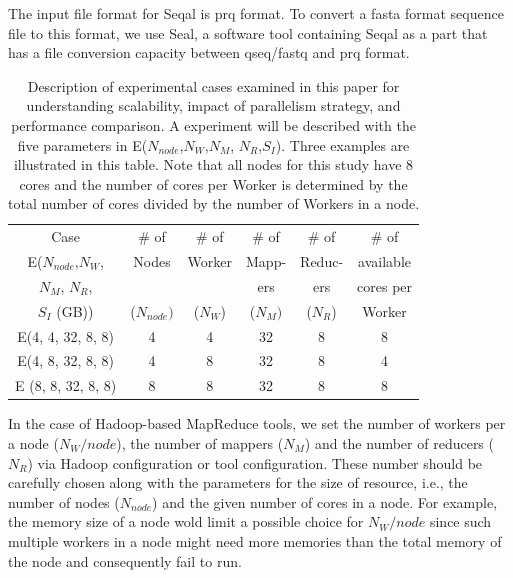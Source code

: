 \documentclass{acm_proc_article-sp}
\begin{document}
The input file format for Seqal is prq format.  To convert a fasta
format sequence file to this format, we use Seal, a software tool
containing Seqal as a part that has a file conversion capacity between
qseq/fastq and prq format.

\begin{table}
\small
 \begin{tabular}{|c|c|c|c|c|c|} 
 \hline 

Case & \# of  & \# of &  \# of & \# of & \# of  \\
E($N_{node}$,$N_W$,  & Nodes & Worker   & Mapp- & Reduc- & available  \\
$N_M$, $N_R$,  & &  & ers & ers & cores per\\
$S_I$ (GB)) & ($N_{node})$& ($N_W$) & ($N_M) $ & ($N_R$) & Worker \\
 \hline
E(4, 4, 32, 8, 8) &4 &  4 & 32  & 8 & 8 \\
E(4, 8, 32, 8, 8) & 4 & 8 & 32 & 8 & 4 \\
E (8, 8, 32, 8, 8) & 8 & 8 & 32 & 8 & 8 \\ 
 \hline
 \end{tabular}

 \caption{Description of experimental cases examined in this paper for understanding scalability, impact of parallelism strategy, and performance comparison.  A experiment will be described with the five parameters in E($N_{node}$,$N_W$,$N_M$, $N_R$,$S_I$).  Three examples are illustrated in this table.  Note that all nodes for this study have 8 cores and the number of cores per Worker is determined by the total number of cores divided by the number of Workers in a node.}
    \label{table:exp-description} 
\end{table}

In the case of Hadoop-based MapReduce tools, we set the number of
workers per a node ($N_{W}/node$), the
number of mappers ($N_M$) and the number of reducers ($N_R$) via
Hadoop configuration or tool configuration.  These number should be
carefully chosen along with the parameters for the size of resource,
i.e., the number of nodes ($N_{node}$) and the given number of cores
in a node.  For example, the memory size of a node wold limit a
possible choice for $N_{W}/node$ since such multiple workers in a node
might need more memories than the total memory of the node and
consequently fail to run.  
\end{document}
